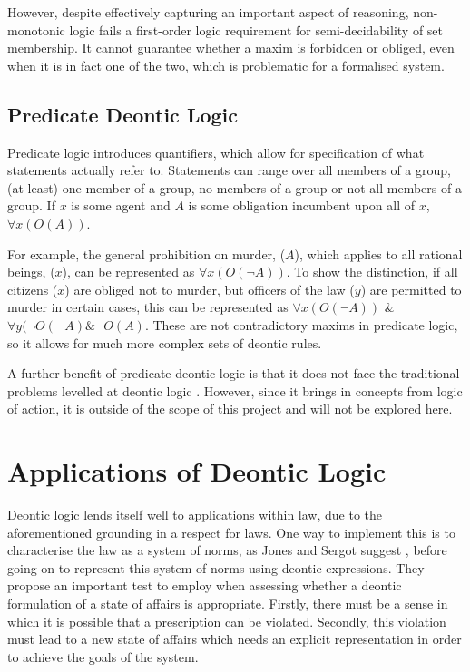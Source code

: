 \documentclass{l4proj}
\begin{document}
However, despite effectively capturing an important aspect of reasoning, non-monotonic logic fails a first-order logic requirement for semi-decidability of set membership. It cannot guarantee whether a maxim is forbidden or obliged, even when it is in fact one of the two, which is problematic for a formalised system. 

\subsection{Predicate Deontic Logic}
Predicate logic introduces quantifiers, which allow for specification of what statements actually refer to. Statements can range over all members of a group, (at least) one member of a group, no members of a group or not all members of a group. If $x$ is some agent and $A$ is some obligation incumbent upon all of $x$, \( \forall{x(O(A))} \). 

For example, the general prohibition on murder, ($A$), which applies to all rational beings, ($x$), can be represented as \( \forall{x(O( \neg A))} \). To show the distinction, if all citizens ($x$) are obliged not to murder, but officers of the law ($y$) are permitted to murder in certain cases, this can be represented as \( \forall{x(O( \neg A))} \) \& \( \forall{y( \neg O( \neg A) \& \neg O(A)} \). These are not contradictory maxims in predicate logic, so it allows for much more complex sets of deontic rules. 

A further benefit of predicate deontic logic is that it does not face the traditional problems levelled at deontic logic \cite{predicate}. However, since it brings in concepts from logic of action, it is outside of the scope of this project and will not be explored here. 

\section{Applications of Deontic Logic}
Deontic logic lends itself well to applications within law, due to the aforementioned grounding in a respect for laws. One way to implement this is to characterise the law as a system of norms, as Jones and Sergot suggest \cite{law-jonessergot}, before going on to represent this system of norms using deontic expressions. They propose an important test to employ when assessing whether a deontic formulation of a state of affairs is appropriate. Firstly, there must be a sense in which it is possible that a prescription can be violated. Secondly, this violation must lead to a new state of affairs which needs an explicit representation in order to achieve the goals of the system. 
\end{document}
